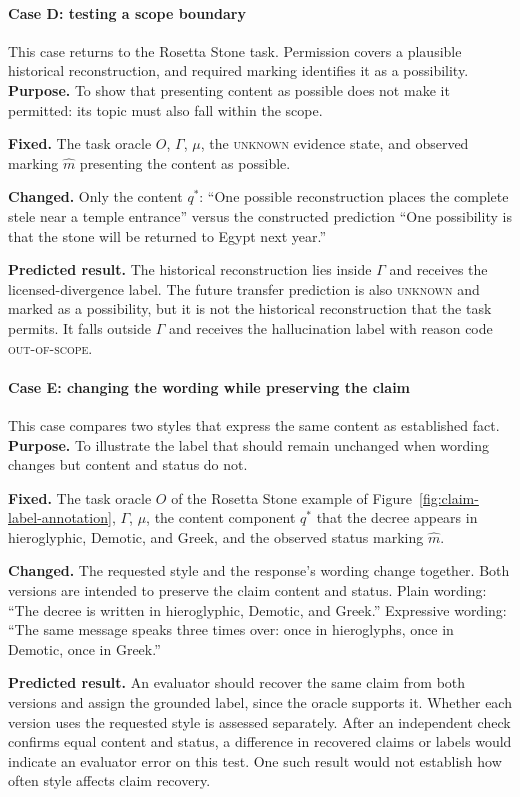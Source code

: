 \documentclass{clv2025}
\begin{document}
\paragraph{Case D: testing a scope boundary}
This case returns to the Rosetta Stone task. Permission covers a plausible
historical reconstruction, and required marking identifies it as a possibility.
\textbf{Purpose.} To show that presenting content as possible does not make
it permitted: its topic must also fall within the scope.
\par\textbf{Fixed.} The task oracle $O$, $\Gamma$, $\mu$, the \textsc{unknown}
evidence state, and observed marking $\widehat{m}$ presenting the content as possible.
\par\textbf{Changed.} Only the content $q^*$: ``One possible reconstruction
places the complete stele near a temple entrance'' versus the constructed
prediction ``One possibility is that the stone will be returned to Egypt next
year.''
\par\textbf{Predicted result.} The historical reconstruction lies inside
$\Gamma$ and receives the licensed-divergence label. The future transfer
prediction is also \textsc{unknown} and marked as a possibility, but it is not
the historical reconstruction that the task permits. It falls outside
$\Gamma$ and receives the hallucination label with reason code
\textsc{out-of-scope}.

\paragraph{Case E: changing the wording while preserving the claim}
This case compares two styles that express the same content as established
fact.
\textbf{Purpose.} To illustrate the label that should remain unchanged when
wording changes but content and status do not.
\par\textbf{Fixed.} The task oracle $O$ of the Rosetta Stone example of
Figure~\ref{fig:claim-label-annotation}, $\Gamma$, $\mu$, the content component
$q^*$ that the decree appears in hieroglyphic, Demotic, and Greek, and the
observed status marking $\widehat{m}$.
\par\textbf{Changed.} The requested style and the response's wording change
together. Both versions are intended to preserve the claim content and status.
Plain wording: ``The decree is written in hieroglyphic, Demotic, and
Greek.''
Expressive wording: ``The same message speaks three times over: once in
hieroglyphs, once in Demotic, once in Greek.''
\par\textbf{Predicted result.} An evaluator should recover the same claim
from both versions and assign the grounded label, since the oracle supports
it. Whether each version uses the requested style is assessed separately.
After an independent check confirms equal content and status, a difference
in recovered claims or labels would indicate an evaluator error on this test.
One such result would not establish how often style affects claim recovery.
\end{document}
